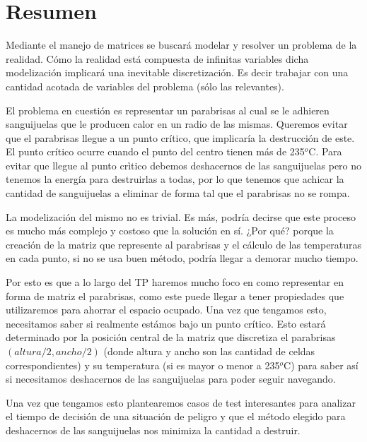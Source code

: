 \section{Resumen}

Mediante el manejo de matrices se buscará modelar y resolver un problema de la realidad. Cómo la realidad está compuesta de infinitas variables dicha modelización implicará una inevitable discretización. Es decir trabajar con una 
cantidad acotada de variables del problema (sólo las relevantes).

El problema en cuestión es representar un parabrisas al cual se le adhieren sanguijuelas que le producen calor en un radio de las mismas. Queremos evitar que el parabrisas llegue a un punto crítico, que implicaría la destrucción de este. El punto crítico ocurre cuando el punto del centro tienen más de 235${}^o$C. Para evitar que llegue al punto crìtico debemos deshacernos de las sanguijuelas pero no tenemos la energía para destruirlas a todas, por lo que tenemos que achicar la cantidad de sanguijuelas a eliminar de forma tal que el parabrisas no se rompa.

La modelización del mismo no es trivial. Es más, podría decirse que este proceso es mucho más complejo y costoso que la solución en sí. ¿Por qué? porque la creación de la matriz que represente al parabrisas y el cálculo de las temperaturas en cada punto, si no se usa buen método, podría llegar a demorar mucho tiempo. 

Por esto es que a lo largo del TP haremos mucho foco en como representar en forma de matriz el parabrisas, como este puede llegar a tener propiedades que utilizaremos para ahorrar el espacio ocupado. Una vez que tengamos esto, necesitamos saber si realmente estámos bajo un punto crítico. Esto estará determinado por la posición central  de la matriz que discretiza el parabrisas $(altura/2,ancho/2)$ (donde altura y ancho son las cantidad de celdas correspondientes) y su temperatura (si es mayor o menor a 235${}^o$C) para saber así si necesitamos deshacernos de las sanguijuelas para poder seguir navegando.

Una vez que tengamos esto plantearemos casos de test interesantes para analizar el tiempo de decisión de una situación de peligro y que el método elegido para deshacernos de las sanguijuelas nos minimiza la cantidad a destruir.


